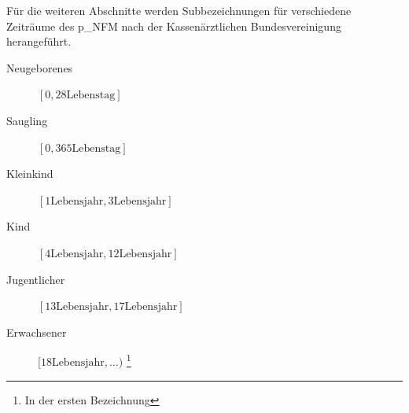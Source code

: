 \begin{itemize}
Für die weiteren Abschnitte werden Subbezeichnungen für verschiedene Zeiträume des \gls{p_NFM} nach der Kassenärztlichen Bundesvereinigung herangeführt.
\begin{description}
	\item[Neugeborenes] $[0, 28 \text{Lebenstag}]$
	\item[Saugling] $[0,365 \text{Lebenstag}]$
	\item[Kleinkind] $[1 \text{Lebensjahr}, 3 \text{Lebensjahr}]$
	\item[Kind] $[4 \text{Lebensjahr}, 12 \text{Lebensjahr}]$
	\item[Jugentlicher] $[13 \text{Lebensjahr}, 17 \text{Lebensjahr}]$
	\item[Erwachsener] $[18 \text{Lebensjahr}, \dots )$ \footnote{In der ersten Bezeichnung}
\end{description} 



\end{itemize}
